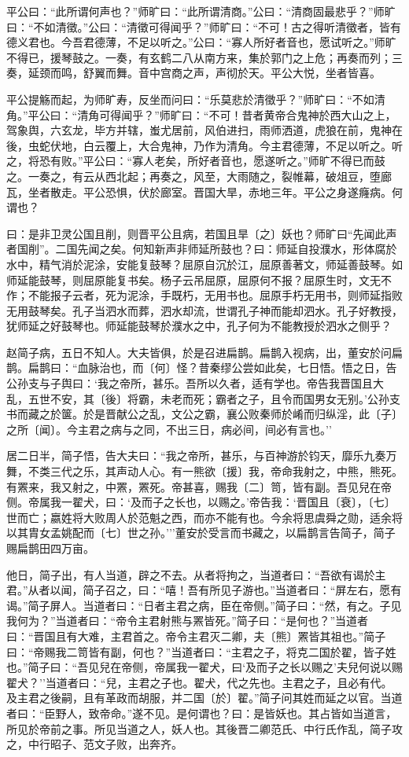 \documentclass[]{article}
\begin{document}
平公曰：``此所谓何声也？''师旷曰：``此所谓清商。''公曰：``清商固最悲乎？''师旷曰：``不如清徵。''公曰：``清徵可得闻乎？''师旷曰：``不可！古之得听清徵者，皆有德义君也。今吾君德薄，不足以听之。''公曰：``寡人所好者音也，愿试听之。''师旷不得已，援琴鼓之。一奏，有玄鹤二八从南方来，集於郭门之上危；再奏而列；三奏，延颈而鸣，舒翼而舞。音中宫商之声，声彻於天。平公大悦，坐者皆喜。

平公提觞而起，为师旷寿，反坐而问曰：``乐莫悲於清徵乎？''师旷曰：``不如清角。''平公曰：``清角可得闻乎？''师旷曰：``不可！昔者黄帝合鬼神於西大山之上，驾象舆，六玄龙，毕方并辖，蚩尤居前，风伯进扫，雨师洒道，虎狼在前，鬼神在後，虫蛇伏地，白云覆上，大合鬼神，乃作为清角。今主君德薄，不足以听之。听之，将恐有败。''平公曰：``寡人老矣，所好者音也，愿遂听之。''师旷不得已而鼓之。一奏之，有云从西北起；再奏之，风至，大雨随之，裂帷幕，破俎豆，堕廊瓦，坐者散走。平公恐惧，伏於廊室。晋国大旱，赤地三年。平公之身遂癃病。何谓也？

曰：是非卫灵公国且削，则晋平公且病，若国且旱〔之〕妖也？师旷曰``先闻此声者国削''。二国先闻之矣。何知新声非师延所鼓也？曰：师延自投濮水，形体腐於水中，精气消於泥涂，安能复鼓琴？屈原自沉於江，屈原善著文，师延善鼓琴。如师延能鼓琴，则屈原能复书矣。杨子云吊屈原，屈原何不报？屈原生时，文无不作；不能报子云者，死为泥涂，手既朽，无用书也。屈原手朽无用书，则师延指败无用鼓琴矣。孔子当泗水而葬，泗水却流，世谓孔子神而能却泗水。孔子好教授，犹师延之好鼓琴也。师延能鼓琴於濮水之中，孔子何为不能教授於泗水之侧乎？

赵简子病，五日不知人。大夫皆俱，於是召进扁鹊。扁鹊入视病，出，董安於问扁鹊。扁鹊曰：``血脉治也，而〔何〕怪？昔秦缪公尝如此矣，七日悟。悟之日，告公孙支与子舆曰：`我之帝所，甚乐。吾所以久者，适有学也。帝告我晋国且大乱，五世不安，其〔後〕将霸，未老而死；霸者之子，且令而国男女无别。'公孙支书而藏之於箧。於是晋献公之乱，文公之霸，襄公败秦师於崤而归纵淫，此〔子〕之所〔闻〕。今主君之病与之同，不出三日，病必间，间必有言也。''

居二日半，简子悟，告大夫曰：``我之帝所，甚乐，与百神游於钧天，靡乐九奏万舞，不类三代之乐，其声动人心。有一熊欲〔援〕我，帝命我射之，中熊，熊死。有罴来，我又射之，中罴，罴死。帝甚喜，赐我〔二〕笥，皆有副。吾见兒在帝侧。帝属我一翟犬，曰：`及而子之长也，以赐之。'帝告我：`晋国且〔衰〕，〔七〕世而亡；嬴姓将大败周人於范魁之西，而亦不能有也。今余将思虞舜之勋，适余将以其胄女孟姚配而〔七〕世之孙。'''董安於受言而书藏之，以扁鹊言告简子，简子赐扁鹊田四万亩。

他日，简子出，有人当道，辟之不去。从者将拘之，当道者曰：``吾欲有谒於主君。''从者以闻，简子召之，曰：``嘻！吾有所见子游也。''当道者曰：``屏左右，愿有谒。''简子屏人。当道者曰：``日者主君之病，臣在帝侧。''简子曰：``然，有之。子见我何为？''当道者曰：``帝令主君射熊与罴皆死。''简子曰：``是何也？''当道者曰：``晋国且有大难，主君首之。帝令主君灭二卿，夫〔熊〕罴皆其祖也。''简子曰：``帝赐我二笥皆有副，何也？''当道者曰：``主君之子，将克二国於翟，皆子姓也。''简子曰：``吾见兒在帝侧，帝属我一翟犬，曰`及而子之长以赐之'夫兒何说以赐翟犬？''当道者曰：``兒，主君之子也。翟犬，代之先也。主君之子，且必有代。及主君之後嗣，且有革政而胡服，并二国〔於〕翟。''简子问其姓而延之以官。当道者曰：``臣野人，致帝命。''遂不见。是何谓也？曰：是皆妖也。其占皆如当道言，所见於帝前之事。所见当道之人，妖人也。其後晋二卿范氏、中行氏作乱，简子攻之，中行昭子、范文子败，出奔齐。
\end{document}
